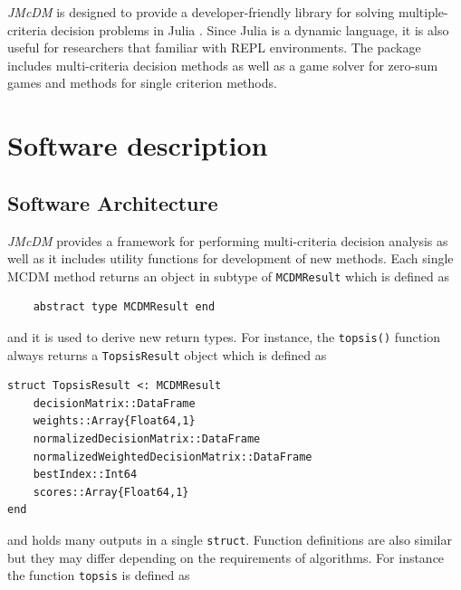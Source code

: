 \documentclass[preprint,review, 12pt, a4paper]{elsarticle}
\begin{document}
\emph{JMcDM} is designed to provide a developer-friendly library for solving multiple-criteria decision problems in Julia \cite{julia}. Since Julia is a dynamic language, it is also useful for researchers that familiar with REPL environments. The package includes multi-criteria decision methods as well as a game solver for zero-sum games and methods for single criterion methods. 

\section{Software description}
\label{sec:software_description}



\subsection{Software Architecture}
\label{section:softwareArch}

\emph{JMcDM} provides a framework for performing multi-criteria decision analysis as well as it includes utility functions for development of new methods. Each single MCDM method returns an object in subtype of \texttt{MCDMResult} which is defined as 

\begin{verbatim}
	abstract type MCDMResult end
\end{verbatim}

\noindent and it is used to derive new return types. For instance, the \texttt{topsis()} function always returns a \texttt{TopsisResult} object which is defined as 

\begin{verbatim}
struct TopsisResult <: MCDMResult
    decisionMatrix::DataFrame
    weights::Array{Float64,1}
    normalizedDecisionMatrix::DataFrame
    normalizedWeightedDecisionMatrix::DataFrame 
    bestIndex::Int64 
    scores::Array{Float64,1}
end
\end{verbatim}

\noindent and holds many outputs in a single \texttt{struct}. Function definitions are also similar but they may differ depending on the requirements of algorithms. For instance the function \texttt{topsis} is defined as
\end{document}
